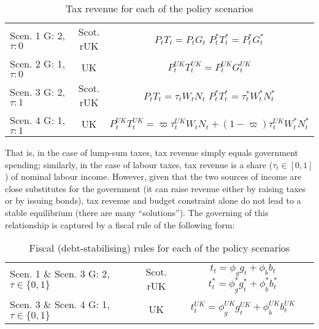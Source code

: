 \begin{table}[H]
    \renewcommand{\arraystretch}{2}
    \centering
    \begin{tabular}{l|c|c}
    \makecell{Scen. 1 \\ G: 2, $\tau: 0$} & \makecell{Scot. \\ rUK } & 
        \makecell{
            $P_t T_t = P_tG_t$\\
            $ P^*_tT^*_t = P^*_tG^*_t $
        }  \\ 
    \makecell{Scen. 2 \\ G: 1, $\tau: 0$} & UK & 
    $P^{UK}_tT^{UK}_t = P^{UK}_tG^{UK}_t$\\
    \makecell{Scen. 3 \\ G: 2, $\tau: 1$} & \makecell{Scot. \\ rUK } & 
    \makecell{
        $P_tT_t = \tau_tW_t N_t$\\ 
        $P^*_tT^*_t = \tau^*_tW^*_t N^*_t$
    }  \\
    \makecell{Scen. 4 \\ G: 1, $\tau: 1$} & UK & 
    $P^{UK}_tT^{UK}_t = \varpi\tau^{UK}_tW_t N_t + (1-\varpi)\tau^{UK}_tW^*_t N^*_t$
    \end{tabular}
    \caption{Tax revenue for each of the policy scenarios}
\end{table}
That is, in the case of lump-sum taxes, tax revenue simply equals government spending; similarly, in the case of labour taxes, tax revenue is a share ($ \tau_t \in [0,1]$) of nominal labour income. However, given that the two sources of income are close substitutes for the government (it can raise revenue either by raising taxes or by issuing bonds), tax revenue and budget constraint alone do not lead to a stable equilibrium (there are many ``solutions''). The governing of this relationship is captured by a fiscal rule of the following form:
\begin{table}[H]
    \renewcommand{\arraystretch}{2}
    \centering
    \begin{tabular}{l|c|c}
        \makecell{Scen. 1 \& Scen. 3\\ G: 2, $\tau \in \{0, 1\}$} & \makecell{Scot. \\ rUK } & 
        \makecell{
            $t_t = \phi_g  g_t + \phi_b b_t$\\
            $t^*_t = \phi^*_g g^*_t + \phi^*_b b^*_t$\\
        }  \\ 
        \makecell{Scen. 3 \& Scen. 4\\ G: 1, $\tau \in \{0, 1\}$} & UK & 
        $t^{UK}_t = \phi^{UK}_g g^{UK}_t + \phi^{UK}_b b^{UK}_t$
    \end{tabular}
    \caption{Fiscal (debt-stabilising) rules for each of the policy scenarios}
\end{table}
